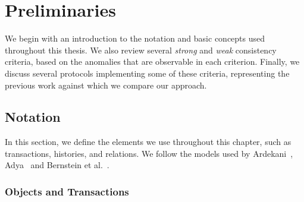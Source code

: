 \cleardoublepage
\chapter{Preliminaries}


We begin with an introduction to the notation and basic concepts used throughout this thesis. We also review several \emph{strong} and \emph{weak} consistency criteria, based on the anomalies that are observable in each criterion. Finally, we discuss several protocols implementing some of these criteria, representing the previous work against which we compare our approach.

\section{Notation}

In this section, we define the elements we use throughout this chapter, such as transactions, histories, and relations. We follow the models used by Ardekani~\citep{ardekani_thesis}, Adya~\citep{adya_thesis} and Bernstein et al.~\citep{bernstein_concurrency}.

\subsection{Objects and Transactions}

